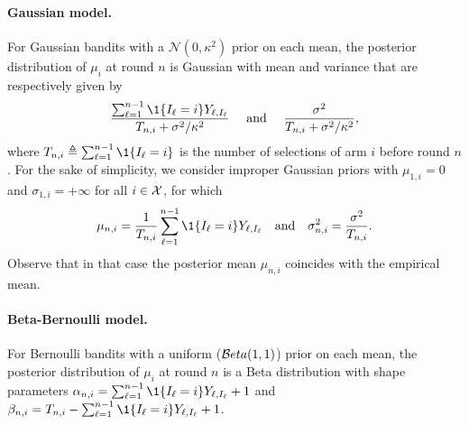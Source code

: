 \paragraph{Gaussian model.} For Gaussian bandits with a $\mathcal{N}(0,\kappa^2)$ prior on each mean, the posterior distribution of $\mu_i$ at round $n$ is Gaussian with mean and variance that are respectively given by
\[\frac{\sum_{\ell=1}^{n-1} \1\{I_\ell = i\} Y_{\ell,I_\ell}}{T_{n,i} + \sigma^2/\kappa^2}\quad\text{ and }\quad \frac{\sigma^2}{T_{n,i} + \sigma^2/\kappa^2},\]
where $T_{n,i}\eqdef\sum_{\ell=1}^{n-1} \1{\{ I_{\ell} = i \}}$ is the number of selections of arm $i$ before round $n$.
% 
For the sake of simplicity, we consider improper Gaussian priors with $\mu_{1,i}=0$ and $\sigma_{1,i}=+\infty$ for all $i\in\mathcal{X}$, for which
\[
    \mu_{n,i}  = \frac{1}{T_{n,i}} \sum_{\ell=1}^{n-1} \1\{I_\ell = i\}Y_{\ell,I_\ell} \quad \text{and} \quad \sigma_{n,i}^2 = \frac{\sigma^2}{T_{n,i}}.
\]
Observe that in that case the posterior mean $\mu_{n,i}$ coincides with the empirical mean.

\paragraph{Beta-Bernoulli model.} For Bernoulli bandits with a uniform ($\mathcal{B} eta(1,1)$) prior on each mean, the posterior distribution of $\mu_i$ at round $n$ is a Beta distribution with shape parameters $\alpha_{n,i} = \sum_{\ell=1}^{n-1} \1{\{ I_{\ell} = i \}} Y_{\ell,I_{\ell}} +1$ and $\beta_{n,i} = T_{n,i} - \sum_{\ell=1}^{n-1} \1{\{ I_{\ell} = i \}} Y_{\ell,I_{\ell}} + 1$. 

